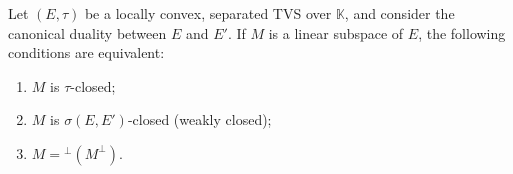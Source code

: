 Let $(E, \tau)$ be a locally convex, separated TVS over $\mathbb{K}$, and consider the canonical duality between $E$ and $E'$. If $M$ is a linear subspace of $E$, the following conditions are equivalent:
\begin{enumerate}
\item[(a)] $M$ is $\tau$-closed;
\item[(b)] $M$ is $\sigma(E, E')$-closed (weakly closed);
\item[(c)] $M = {}^\perp(M^\perp)$.
\end{enumerate}
